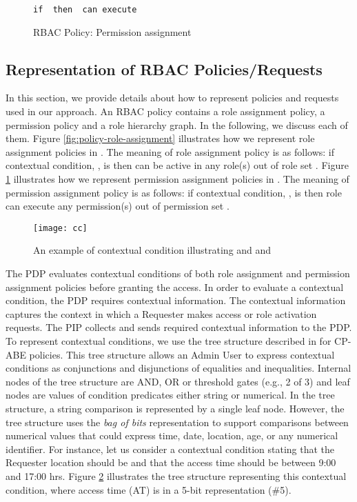 \documentclass[final,5p,times,twocolumn]{elsarticle}
\newcommand{\Keywords}{\lstset{keywords={if,then,can,be,active,in,execute}}}
\begin{document}
\begin{figure}
\Keywords
\begin{lstlisting}[style=AMMA,numbers=none,breaklines,mathescape,rulesepcolor=\color{black}]
if  then  can execute 

\end{lstlisting}
\caption{RBAC Policy: Permission assignment}
\label{fig:policy-permission-assignment}
\end{figure}

\subsection{Representation of RBAC Policies/Requests}
\label{sec:representation}
In this section, we provide details about how to represent policies and requests used in our approach. An RBAC policy contains a role assignment policy, a permission policy and a role hierarchy graph. In the following, we discuss each of them. Figure \ref{fig:policy-role-assignment} illustrates how we represent role assignment policies in . The meaning of role assignment policy is as follows: if contextual condition, , is  then  can be active in any role(s) out of role set . Figure \ref{fig:policy-permission-assignment} illustrates how we represent permission assignment policies in . The meaning of permission assignment policy is as follows: if contextual condition, , is  then role  can execute any permission(s) out of permission set .

\begin{figure}
\centering
\texttt{[image: cc]}
\caption{An example of contextual condition illustrating  and  and }
\label{fig:cc}
\end{figure}

The PDP evaluates contextual conditions of both role assignment and permission assignment policies before granting the access. In order to evaluate a contextual condition, the PDP requires contextual information. The contextual information captures the context in which a Requester makes access or role activation requests. The PIP collects and sends required contextual information to the PDP. To represent contextual conditions, we use the tree structure described in \cite{Bethencourt2007} for CP-ABE policies. This tree structure allows an Admin User to express contextual conditions as conjunctions and disjunctions of equalities and inequalities. Internal nodes of the tree structure are AND, OR or threshold gates (e.g., 2 of 3) and leaf nodes are values of condition predicates either string or numerical. In the tree structure, a string comparison is represented by a single leaf node. However, the tree structure uses the \emph{bag of bits} representation to support comparisons between numerical values that could express time, date, location, age, or any numerical identifier. For instance, let us consider a contextual condition stating that the Requester location should be  and that the access time should be between 9:00 and 17:00 hrs. Figure \ref{fig:cc} illustrates the tree structure representing this contextual condition, where access time (AT) is in a 5-bit representation (\#5).
\end{document}
